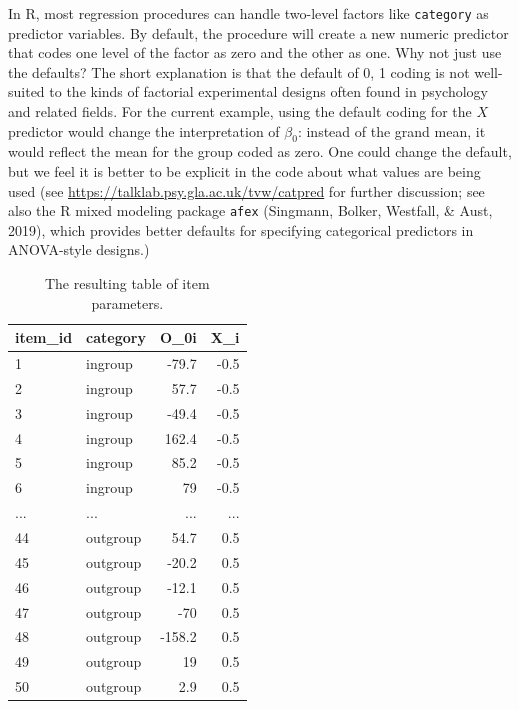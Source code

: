 \documentclass[
  english,
  doc,floatsintext]{apa6}
\begin{document}
In R, most regression procedures can handle two-level factors like \texttt{category} as predictor variables. By default, the procedure will create a new numeric predictor that codes one level of the factor as zero and the other as one. Why not just use the defaults? The short explanation is that the default of 0, 1 coding is not well-suited to the kinds of factorial experimental designs often found in psychology and related fields. For the current example, using the default coding for the \(X\) predictor would change the interpretation of \(\beta_0\): instead of the grand mean, it would reflect the mean for the group coded as zero. One could change the default, but we feel it is better to be explicit in the code about what values are being used (see \url{https://talklab.psy.gla.ac.uk/tvw/catpred} for further discussion; see also the R mixed modeling package \texttt{afex} (Singmann, Bolker, Westfall, \& Aust, 2019), which provides better defaults for specifying categorical predictors in ANOVA-style designs.)

\begin{table}[H]

\begin{center}
\begin{threeparttable}

\caption{\label{tab:items-table}The resulting table of item parameters.}

\begin{tabular}{llrr}
\toprule
item\_id & \multicolumn{1}{c}{category} & \multicolumn{1}{c}{O\_0i} & \multicolumn{1}{c}{X\_i}\\
\midrule
1 & ingroup & -79.7 & -0.5\\
2 & ingroup & 57.7 & -0.5\\
3 & ingroup & -49.4 & -0.5\\
4 & ingroup & 162.4 & -0.5\\
5 & ingroup & 85.2 & -0.5\\
6 & ingroup & 79 & -0.5\\
... & ... & ... & ...\\
44 & outgroup & 54.7 & 0.5\\
45 & outgroup & -20.2 & 0.5\\
46 & outgroup & -12.1 & 0.5\\
47 & outgroup & -70 & 0.5\\
48 & outgroup & -158.2 & 0.5\\
49 & outgroup & 19 & 0.5\\
50 & outgroup & 2.9 & 0.5\\
\bottomrule
\end{tabular}

\end{threeparttable}
\end{center}

\end{table}
\end{document}
